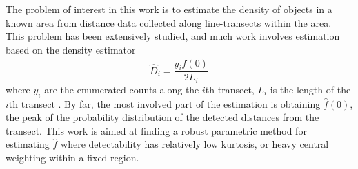 \documentclass[landscape,a1paper,fontscale=0.450]{baposter} %
\begin{document}
\begin{poster}
{\begin{multicols}{2}
  The problem of interest in this work is to estimate the density of objects in
  a known area from distance data collected along line-transects within the
  area.  This problem has been extensively studied, and much work involves
  estimation based on the density estimator
  \begin{equation}
    \hat D_i = \frac {y_i \hat f(0)}{2L_i}
  \end{equation}
  where $y_i$ are the enumerated counts along the $i$th transect, $L_i$ is the
  length of the $i$th transect\cite{buckland2001introduction}
   \cite{thompson2012sampling}. By far, the most involved part of the
  estimation is obtaining $\hat f(0)$, the peak of the probability distribution
  of the detected distances from the transect. This work is aimed at finding a robust
  parametric method for estimating $\hat f$ where detectability has relatively low kurtosis, or heavy central weighting within a fixed region.  \vspace{1cm}
\end{multicols}
}




\end{poster}
\end{document}
